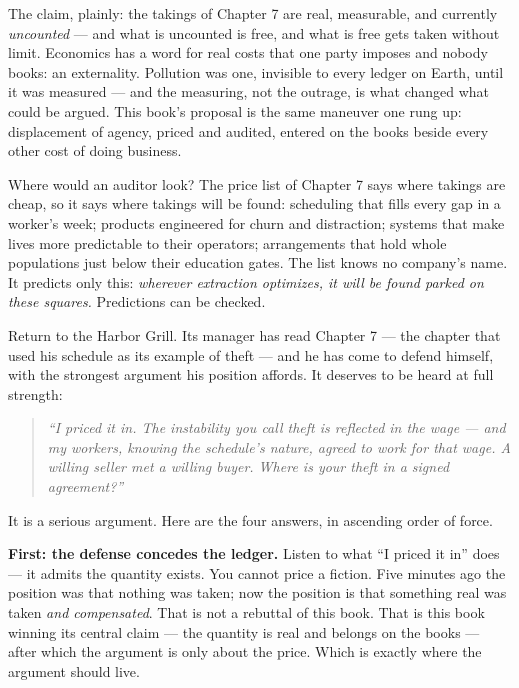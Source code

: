 The claim, plainly: the takings of Chapter 7 are real, measurable, and
currently \emph{uncounted} --- and what is uncounted is free, and what is
free gets taken without limit. Economics has a word for real costs
that one party imposes and nobody books: an externality. Pollution was
one, invisible to every ledger on Earth, until it was measured --- and
the measuring, not the outrage, is what changed what could be argued.
This book's proposal is the same maneuver one rung up: displacement of
agency, priced and audited, entered on the books beside every other
cost of doing business.

Where would an auditor look? The price list of Chapter 7 says where
takings are cheap, so it says where takings will be found: scheduling
that fills every gap in a worker's week; products engineered for churn
and distraction; systems that make lives more predictable to their
operators; arrangements that hold whole populations just below their
education gates. The list knows no company's name. It predicts only
this: \emph{wherever extraction optimizes, it will be found parked on these
squares.} Predictions can be checked.


Return to the Harbor Grill. Its manager has read Chapter 7 --- the
chapter that used his schedule as its example of theft --- and he has
come to defend himself, with the strongest argument his position
affords. It deserves to be heard at full strength:

\begin{quote}\itshape ``I priced it in. The instability you call theft is reflected in the
wage --- and my workers, knowing the schedule's nature, agreed to work
for that wage. A willing seller met a willing buyer. Where is your theft
in a signed agreement?''\end{quote}

It is a serious argument. Here are the four answers, in ascending
order of force.

\textbf{First: the defense concedes the ledger.} Listen to what ``I priced
it in'' does --- it admits the quantity exists. You cannot price a
fiction. Five minutes ago the position was that nothing was taken;
now the position is that something real was taken \emph{and compensated}.
That is not a rebuttal of this book. That is this book winning its
central claim --- the quantity is real and belongs on the books --- after
which the argument is only about the price. Which is exactly where the
argument should live.


